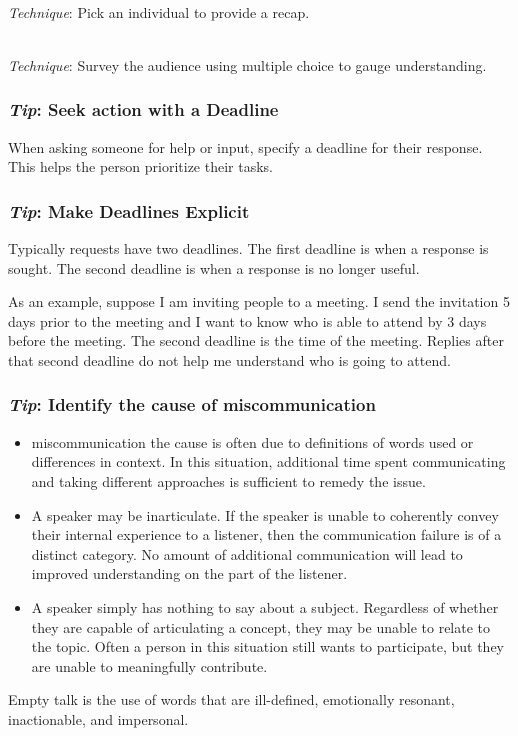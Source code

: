 \ \\
\textit{Technique}: Pick an individual to provide a recap.

\ \\
\textit{Technique}: Survey the audience using multiple choice to gauge understanding.

\subsubsection*{\textit{Tip}: Seek action with a Deadline}

When asking someone for help or input, specify a deadline for their response. 
This helps the person prioritize their tasks.


\subsubsection*{\textit{Tip}: Make Deadlines Explicit}

Typically requests have two deadlines. The first deadline is when a response is sought. The second deadline is when a response is no longer useful.  

As an example, suppose I am inviting people to a meeting. I send the invitation 5 days prior to the meeting and I want to know who is able to attend by 3 days before the meeting. The second deadline is the time of the meeting. Replies after that second deadline do not help me understand who is going to attend. 


\subsubsection*{\textit{Tip}: Identify the cause of miscommunication}

\begin{itemize}
    \item miscommunication the cause is often due to definitions of words used or differences in context. In this situation, additional time spent communicating and taking different approaches is sufficient to remedy the issue.
\item A speaker may be inarticulate. If the speaker is unable to coherently convey their internal experience to a listener, then the communication failure is of a distinct category. No amount of additional communication will lead to improved understanding on the part of the listener.
\item A speaker simply has nothing to say about a subject. Regardless of whether they are capable of articulating a concept, they may be unable to relate to the topic. Often a person in this situation still wants to participate, but they are unable to meaningfully contribute. 
\end{itemize}
Empty talk is the use of words that are ill-defined, emotionally resonant, inactionable, and impersonal.

